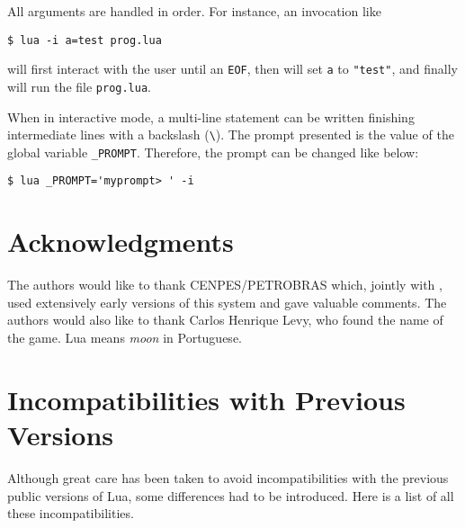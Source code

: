 All arguments are handled in order.
For instance, an invocation like
\begin{verbatim}
$ lua -i a=test prog.lua
\end{verbatim}
will first interact with the user until an \verb|EOF|,
then will set \verb|a| to \verb|"test"|,
and finally will run the file \verb|prog.lua|.

When in interactive mode,
a multi-line statement can be written finishing intermediate
lines with a backslash (\verb|\|).
The prompt presented is the value of the global variable \verb|_PROMPT|.
Therefore, the prompt can be changed like below:
\begin{verbatim}
$ lua _PROMPT='myprompt> ' -i
\end{verbatim}

\section*{Acknowledgments}

The authors would like to thank CENPES/PETROBRAS which,
jointly with \tecgraf, used extensively early versions of
this system and gave valuable comments.
The authors would also like to thank Carlos Henrique Levy,
who found the name of the game.
Lua means \emph{moon} in Portuguese.



\appendix

\section*{Incompatibilities with Previous Versions}

Although great care has been taken to avoid incompatibilities with
the previous public versions of Lua,
some differences had to be introduced.
Here is a list of all these incompatibilities.

